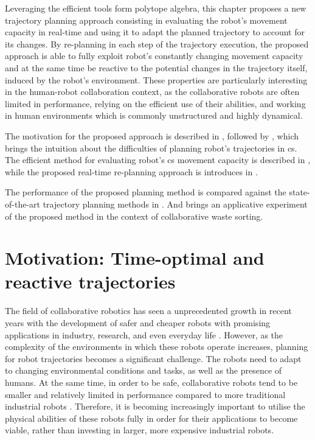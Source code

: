 Leveraging the efficient tools form polytope algebra, this chapter proposes a new trajectory planning approach consisting in evaluating the robot's movement capacity in real-time and using it to adapt the planned trajectory to account for its changes. By re-planning in each step of the trajectory execution, the proposed approach is able to fully exploit robot's constantly changing movement capacity and at the same time be reactive to the potential changes in the trajectory itself, induced by the robot's environment. 
These properties are particularly interesting in the human-robot collaboration context, as the collaborative robots are often limited in performance, relying on the efficient use of their abilities, and working in human environments which is commonly unstructured and highly dynamical. 


The motivation for the proposed approach is described in , followed by , which brings the intuition about the difficulties of planning robot's trajectories in \gls{cs}. The efficient method for evaluating robot's \gls{cs} movement capacity is described in , while the proposed real-time re-planning approach is introduces in . 

The performance of the proposed planning method is compared against the state-of-the-art trajectory planning methods in . And  brings an applicative experiment of the proposed method in the context of collaborative waste sorting.

\section{Motivation: Time-optimal and reactive trajectories}
\label{ch:topca_motivation}
The field of collaborative robotics has seen a unprecedented growth in recent years with the development of safer and cheaper robots with promising applications in industry, research, and even everyday life \cite{ajoudani2018progress}. However, as the complexity of the environments in which these robots operate increases, planning for robot trajectories becomes a significant challenge.  The robots need to adapt to changing environmental conditions and tasks, as well as the presence of humans. 
At the same time, in order to be safe, collaborative robots tend to be smaller and relatively limited in performance compared to more traditional industrial robots \cite{smu}. Therefore, it is becoming increasingly important to utilise the physical abilities of these robots fully in order for their applications to become viable, rather than investing in larger, more expensive industrial robots. 

